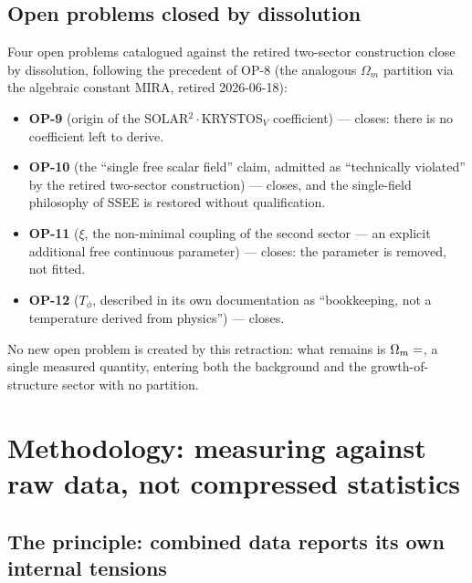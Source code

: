 \documentclass[12pt,a4paper]{article}
\newcommand{\SSEE}{\textsc{SSEE}}
\begin{document}
\subsection{Open problems closed by dissolution}

Four open problems catalogued against the retired two-sector construction close by
dissolution, following the precedent of OP-8 (the analogous $\Omega_m$
partition via the algebraic constant MIRA, retired 2026-06-18):

\begin{itemize}
  \item \textbf{OP-9} (origin of the SOLAR$^2\cdot$KRYSTOS$_V$ coefficient) ---
        closes: there is no coefficient left to derive.
  \item \textbf{OP-10} (the ``single free scalar field'' claim, admitted as
        ``technically violated'' by the retired two-sector construction) --- closes,
        and the single-field philosophy of \SSEE{} is restored without
        qualification.
  \item \textbf{OP-11} ($\xi$, the non-minimal coupling of the second sector
        --- an explicit additional free continuous parameter) --- closes: the
        parameter is removed, not fitted.
  \item \textbf{OP-12} ($T_\phi$, described in its own documentation as
        ``bookkeeping, not a temperature derived from physics'') --- closes.
\end{itemize}

No new open problem is created by this retraction: what remains is
$\Omega_m=\val{OMEGA_M_TOTAL_d6}$, a single measured quantity, entering both the background
and the growth-of-structure sector with no partition.

\section{Methodology: measuring against raw data, not compressed statistics}
\label{sec:method}

\subsection{The principle: combined data reports its own internal tensions}
\end{document}
